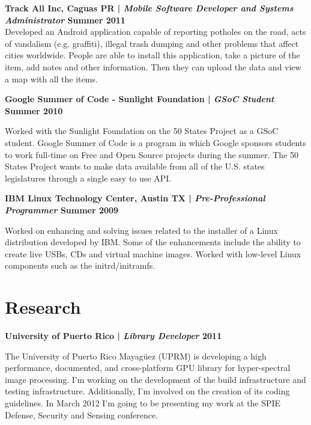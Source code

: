 \documentclass[margin,line]{res}
\begin{document}
\begin{resume}
{\bf Track All Inc, Caguas PR | {\em Mobile Software Developer and Systems Administrator} \hfill {\bf Summer 2011 \\} }
\vspace{-.01cm}
Developed an Android application capable of reporting potholes on the road, acts of vandalism (e.g. graffiti), illegal trash dumping and other problems that affect cities worldwide. People are able to install this application, take a picture of the item, add notes and other information. Then they can upload the data and view a map with all the items.

{\bf Google Summer of Code - Sunlight Foundation | {\em GSoC Student} \hfill {\bf Summer 2010 \\} }
\vspace{-.01cm}

Worked with the Sunlight Foundation on the 50 States Project as a GSoC student. Google Summer of Code is a program in which Google sponsors students to work full-time on Free and Open Source projects during the summer. The 50 States Project wants to make data available from all of the U.S. states legislatures through a single easy to use API. 

{\bf IBM Linux Technology Center, Austin TX | {\em Pre-Professional Programmer} \hfill {\bf Summer 2009 \\} }
\vspace{-.01cm}

Worked on enhancing and solving issues related to the installer of a Linux distribution developed by IBM. Some of the enhancements include the ability to create live USBs, CDs and virtual machine images. Worked with low-level Linux components such as the initrd/initramfs. 

\section{\sc Research}

{\bf University of Puerto Rico | {\em Library Developer} \hfill {\bf 2011 \\} }
\vspace{-.01cm}

The University of Puerto Rico Mayagüez (UPRM) is developing a high performance, documented, and cross-platform GPU library for hyper-spectral image processing. I'm working on the development of the build infrastructure and testing infrastructure. Additionally, I'm involved on the creation of its coding guidelines. In March 2012 I'm going to be presenting my work at the SPIE Defense, Security and Sensing conference. 


\end{resume}
\end{document}
